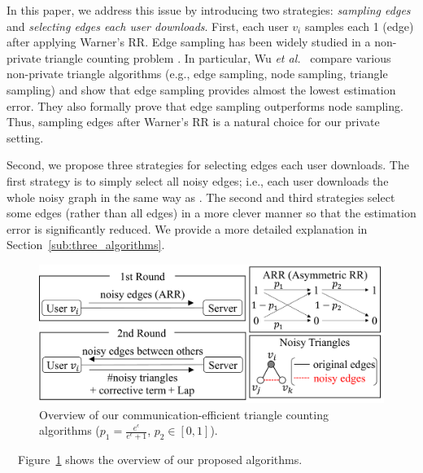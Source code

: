 In this paper, we address this issue by introducing two strategies: \textit{sampling edges} and \textit{selecting edges each user downloads}.
First, each user $v_i$ samples each 1 (edge) after applying Warner's RR.
Edge sampling has been widely studied in a
non-private triangle counting problem \cite{Bera_PODS20,Eden_FOCS15,Tsourakakis_KDD09,Wu_TKDE16}.
In particular, Wu \textit{et al.}~\cite{Wu_TKDE16} compare various non-private triangle algorithms (e.g., edge sampling, node sampling, triangle sampling) and show that edge sampling provides almost the lowest estimation error.
They also formally prove that edge sampling outperforms node sampling.
Thus, sampling edges after Warner's RR is a natural choice for our private setting.

Second, we propose three strategies for selecting edges each user downloads.
The first strategy is to simply select all noisy edges; i.e., each user downloads the whole noisy graph in the same way as \cite{Imola_USENIX21}.
The second and third strategies select some edges (rather than all edges) in a more clever manner so that the estimation error is significantly reduced.
We provide a more detailed explanation in Section~\ref{sub:three_algorithms}.

\begin{figure}[t]
  \centering
  \includegraphics[width=0.99\linewidth]{fig/algorithm_overview.pdf}
  \vspace{-4mm}
  \caption{Overview of our communication-efficient triangle counting algorithms
  ($p_1 =\frac{e^{\epsilon}}{e^{\epsilon}+1}$,
  $p_2 \in [0,1]$).}
  \label{fig:alg_overview}
\end{figure}

\smallskip
{}~~Figure~\ref{fig:alg_overview} shows the overview of our proposed algorithms.


